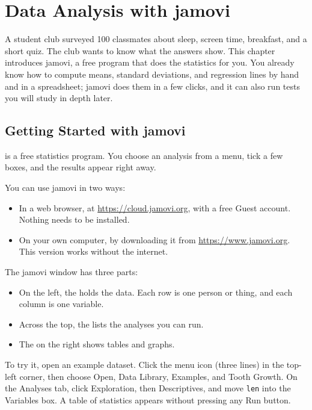 \chapter{Data Analysis with jamovi}

A student club surveyed 100 classmates about sleep, screen time, breakfast, and a short quiz. The club wants to know what the answers show. This chapter introduces jamovi, a free program that does the statistics for you. You already know how to compute means, standard deviations, and regression lines by hand and in a spreadsheet; jamovi does them in a few clicks, and it can also run tests you will study in depth later.

\section{Getting Started with jamovi}

 is a free statistics program. You choose an analysis from a menu, tick a few boxes, and the results appear right away.

You can use jamovi in two ways:
\begin{itemize}
    \item In a web browser, at \url{https://cloud.jamovi.org}, with a free Guest account. Nothing needs to be installed.
    \item On your own computer, by downloading it from \url{https://www.jamovi.org}. This version works without the internet.
\end{itemize}

The jamovi window has three parts:
\begin{itemize}
    \item On the left, the  holds the data. Each row is one person or thing, and each column is one variable.
    \item Across the top, the  lists the analyses you can run.
    \item The  on the right shows tables and graphs.
\end{itemize}


To try it, open an example dataset. Click the menu icon (three lines) in the top-left corner, then choose Open, Data Library, Examples, and Tooth Growth. On the Analyses tab, click Exploration, then Descriptives, and move \texttt{len} into the Variables box. A table of statistics appears without pressing any Run button.


